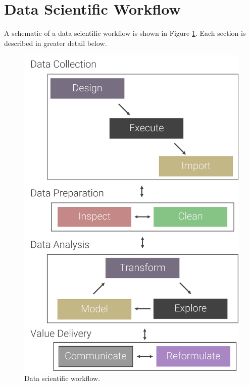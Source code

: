 \documentclass[
]{book}
\begin{document}
\hypertarget{data-scientific-workflow}{%
\section{Data Scientific Workflow}\label{data-scientific-workflow}}

A schematic of a data scientific workflow is shown in Figure \ref{fig:ds-workflow}. Each section is described in greater detail below.

\begin{figure}

{\centering \includegraphics[width=17.38in]{images/data_science_workflow} 

}

\caption{Data scientific workflow.}\label{fig:ds-workflow}
\end{figure}
\end{document}
